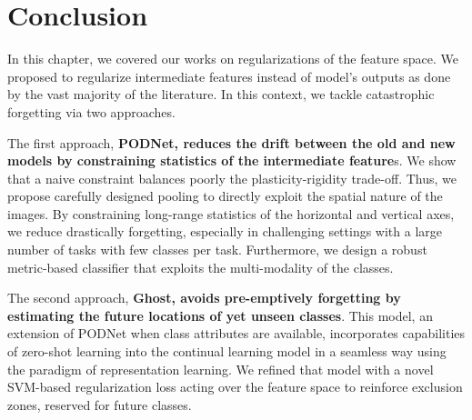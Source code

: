 \section{Conclusion}

In this chapter, we covered our works on regularizations of the feature space. We proposed to
regularize intermediate features instead of model's outputs as done by the vast majority of the
literature. In this context, we tackle catastrophic forgetting via two approaches.

The first approach, \textbf{PODNet, reduces the drift between the old and new models by constraining
    statistics of the intermediate feature}s. We show that a naive constraint balances poorly the
plasticity-rigidity trade-off. Thus, we propose carefully designed pooling to directly exploit
the spatial nature of the images. By constraining long-range statistics of the horizontal and
vertical axes, we reduce drastically forgetting, especially in challenging settings with a large
number of tasks with few classes per task. Furthermore, we design a robust metric-based
classifier that exploits the multi-modality of the classes.

The second approach, \textbf{Ghost, avoids pre-emptively forgetting by estimating the future
    locations of yet unseen classes}. This model, an extension of PODNet when class attributes are
available, incorporates capabilities of zero-shot learning into the continual learning model in
a seamless way using the paradigm of representation learning. We refined that model with a novel
SVM-based regularization loss acting over the feature space to reinforce exclusion zones,
reserved for future classes.
